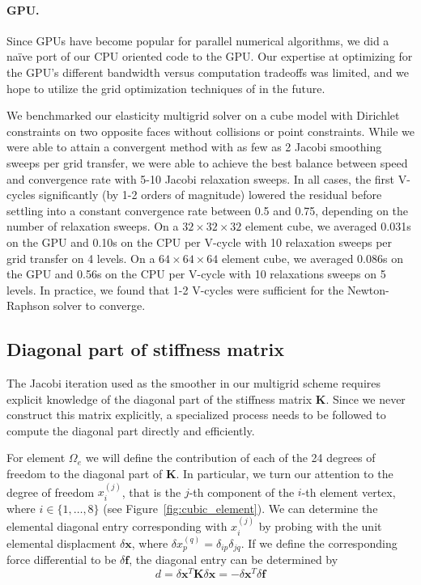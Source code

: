 \paragraph{GPU.} Since GPUs have become popular for parallel numerical algorithms, we did a
na\"{i}ve port of our CPU oriented code to the GPU. Our expertise at optimizing
for the GPU's different bandwidth versus computation tradeoffs was limited, and
we hope to utilize the grid optimization techniques of \cite{Dick:2011:CUDAFEM}
in the future.

We benchmarked our elasticity multigrid solver on a cube model with Dirichlet constraints on two opposite faces without collisions or point constraints. While we were able to attain a
convergent method with as few as 2 Jacobi smoothing sweeps per grid transfer, we were able to achieve the best balance between speed and convergence rate with 5-10 Jacobi relaxation
sweeps.  In all cases, the first V-cycles significantly (by 1-2 orders of magnitude) lowered the residual before settling into a constant convergence rate between 0.5 and 0.75, depending
on the number of relaxation sweeps.
On a $32\times32\times32$ element cube, we averaged 0.031s on the GPU and 0.10s on the CPU  per V-cycle with 10 relaxation
sweeps per grid transfer on 4 levels.  On a $64\times64\times64$ element cube, we averaged 0.086s on the GPU and 0.56s on the CPU per V-cycle with 10 relaxations sweeps on 5 levels.  In practice, we found that 1-2
V-cycles were sufficient for the Newton-Raphson solver to converge.

\subsection{Diagonal part of stiffness matrix}

The Jacobi iteration used as the smoother in our multigrid scheme requires explicit knowledge of the diagonal part of the stiffness matrix $\mathbf{K}$. Since we never construct this
matrix explicitly, a specialized process needs to be followed to compute the diagonal part directly and efficiently. 

For element $\Omega_e$ we will define the contribution of each of the 24 degrees of freedom to the diagonal
part of $\mathbf{K}$. In particular, we turn our attention to the degree of freedom $x_i^{(j)}$, that is the $j$-th component of the $i$-th element vertex, where
$i\in\{1,\ldots,8\}$ (see Figure~\ref{fig:cubic_element}). We can
determine the elemental diagonal entry corresponding with $x_i^{(j)}$ by probing
with the unit elemental displacment $\delta\mathbf{x}$, where $\delta x
^{(q)}_p = \delta_{ip}\delta_{jq}$.  If we define the corresponding
force differential to be $\delta\mathbf{f}$, the diagonal entry can be
determined by
\begin{equation}\label{eqn:diagonal_definition}
d = \delta \mathbf{x}^T\mathbf{K}\delta\mathbf{x} =
-\delta\mathbf{x}^T\delta\mathbf{f}
\end{equation}

